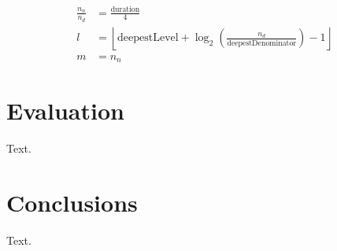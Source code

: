 \documentclass[12pt,twoside,openright]{report}
\begin{document}
\begin{equation}
    \begin{split}
        \frac{n_n}{n_d} &= \frac{\mathrm{duration}}{4} \\
        l &= \left\lfloor \mathrm{deepestLevel} + \log_2\left(\frac{n_d}{\mathrm{deepestDenominator}}\right) - 1 \right\rfloor  \\
        m &= n_n
    \end{split}
    \label{eq:duration_to_level_multiplier}
\end{equation}





\chapter{Evaluation} \label{evaluation}

Text.



\chapter{Conclusions} \label{conclusions}

Text.




\printbibliography[title=References,heading=bibintoc]
\end{document}
